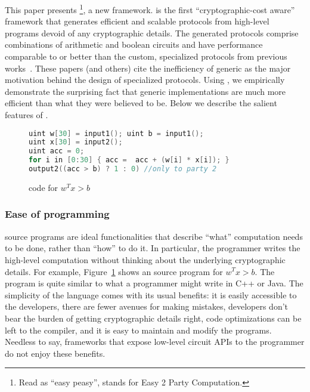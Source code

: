 This paper presents \tool\footnote{Read as ``easy peasy'',
stands for Easy 2 Party Computation.}, a new \mpc framework.
\tool is the first
``cryptographic-cost aware'' framework that generates efficient and
scalable \mpc protocols from high-level programs devoid of any
cryptographic details. The generated protocols comprise combinations
of arithmetic and boolean circuits and have performance comparable to
or better than the custom, specialized
protocols from previous works~\cite{shafindss,wu,minionn,secureml,cryptonets,valeriaMatrix}.
These papers (and others) cite the inefficiency of generic \mpc as the major motivation
behind the design of specialized protocols. Using \tool, we empirically  demonstrate
the surprising fact that generic \mpc implementations are much more efficient than what they were believed to be. 
Below we describe
the salient features of \tool.

\begin{figure}
\begin{lstlisting}[language=C]
uint w[30] = input1(); uint b = input1();
uint x[30] = input2();
uint acc = 0;
for i in [0:30] { acc =  acc + (w[i] * x[i]); }
output2((acc > b) ? 1 : 0) //only to party 2
\end{lstlisting}
\caption{\tool code for $w^Tx >b$}
\label{fig:ex-sml}
\end{figure}

\subsubsection*{Ease of programming} \tool source programs are ideal
functionalities that describe ``what'' computation needs to be done,
rather than ``how'' to do it. In particular, the programmer writes the
high-level computation without thinking about the underlying
cryptographic details. For example, Figure~\ref{fig:ex-sml}
shows an \tool source
program for $w^Tx >b$.
%
%
The program is quite similar to what a programmer might
write in C++ or Java. The simplicity of the
language comes with its usual benefits: it is easily accessible to the
developers, there are fewer avenues for making mistakes, developers
don't bear the burden of getting cryptographic details right, 
code optimizations can be left to the compiler,
and it
is easy to maintain and modify the programs. Needless to say,
frameworks that expose low-level circuit APIs to the programmer do not
enjoy these benefits.

